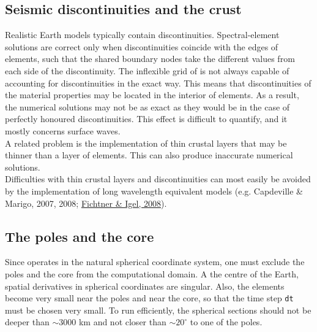 \subsection{Seismic discontinuities and the crust}\label{S:crust}

Realistic Earth models typically contain discontinuities. Spectral-element solutions are correct only when discontinuities coincide with the edges of elements, such that the shared boundary
nodes take the different values from each side of the discontinuity. The inflexible grid of \SES is not always capable of accounting for discontinuities in the exact way. This means that discontinuities of the material properties may be located in the interior of elements. As a result, the numerical solutions may not be as exact as they would be in the case of perfectly honoured discontinuities. This effect is difficult to quantify, and it mostly concerns surface waves.\\[5pt]
A related problem is the implementation of thin crustal layers that may be thinner than a layer of elements. This can also produce inaccurate numerical solutions.\\[5pt]
Difficulties with thin crustal layers and discontinuities can most easily be avoided by the implementation of long wavelength equivalent models (e.g. Capdeville \& Marigo, 2007, 2008; \href{http://www.geo.uu.nl/~fichtner/papers/2008_fichtner_DCM.pdf}{Fichtner \& Igel, 2008}).

\subsection{The poles and the core}

Since \SES operates in the natural spherical coordinate system, one must exclude the poles and the core from the computational domain. A the centre of the Earth, spatial derivatives in spherical coordinates are singular. Also, the elements become very small near the poles and near the core, so that the time step \texttt{dt} must be chosen very small. To run \SES efficiently, the spherical sections should not be deeper than $\sim 3000$ km and not closer than $\sim 20^\circ$ to one of the poles.